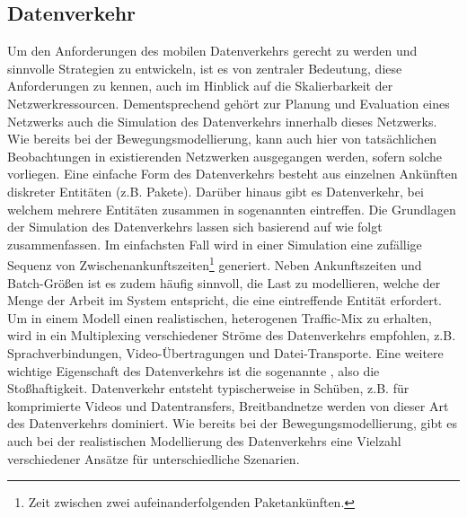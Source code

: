 \documentclass[12pt, a4paper]{article}
\begin{document}
\subsection{Datenverkehr}
\label{sec:traffic}

Um den Anforderungen des mobilen Datenverkehrs gerecht zu werden und sinnvolle Strategien zu entwickeln,
ist es von zentraler Bedeutung, diese Anforderungen zu kennen, auch im Hinblick auf die Skalierbarkeit der
Netzwerkressourcen. \cite{Oliveira2014} Dementsprechend gehört zur Planung und Evaluation eines Netzwerks 
auch die Simulation des Datenverkehrs innerhalb dieses Netzwerks. Wie bereits bei der Bewegungsmodellierung, 
kann auch hier von tatsächlichen Beobachtungen in existierenden Netzwerken ausgegangen werden, sofern solche vorliegen.\newline
Eine einfache Form des Datenverkehrs besteht aus einzelnen Ankünften diskreter Entitäten (z.B. Pakete).
Darüber hinaus gibt es Datenverkehr, bei welchem mehrere Entitäten zusammen in sogenannten  
eintreffen. \cite{Frost1994}
Die Grundlagen der Simulation des Datenverkehrs lassen sich basierend auf \cite{Frost1994} wie folgt zusammenfassen.
Im einfachsten Fall wird in einer Simulation eine zufällige Sequenz von Zwischenankunftszeiten\footnote{Zeit zwischen zwei 
aufeinanderfolgenden Paketankünften.} generiert. Neben Ankunftszeiten und Batch-Größen ist es zudem häufig sinnvoll,
die Last zu modellieren, welche der Menge der Arbeit im System entspricht, die eine eintreffende Entität erfordert.
Um in einem Modell einen realistischen, heterogenen Traffic-Mix zu erhalten, wird in \cite{Frost1994} ein Multiplexing
verschiedener Ströme des Datenverkehrs empfohlen, z.B. Sprachverbindungen, Video-Übertragungen und Datei-Transporte.
Eine weitere wichtige Eigenschaft des Datenverkehrs ist die sogenannte , also die Stoßhaftigkeit.
Datenverkehr entsteht typischerweise in Schüben, z.B. für komprimierte Videos und Datentransfers,
Breitbandnetze werden von dieser Art des Datenverkehrs dominiert. \cite{Frost1994}
Wie bereits bei der Bewegungsmodellierung, gibt es auch bei der realistischen Modellierung des Datenverkehrs
eine Vielzahl verschiedener Ansätze für unterschiedliche Szenarien.
\end{document}
